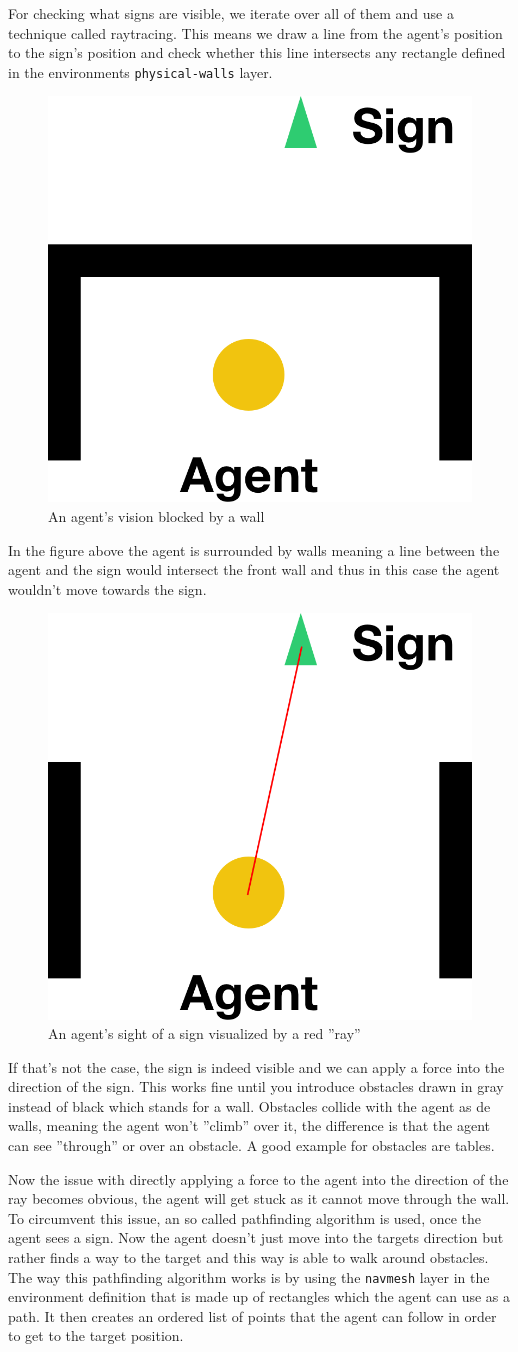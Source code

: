 \documentclass[11pt]{article}
\begin{document}
\begin{itemize}
    For checking what signs are visible, we iterate over all of them and use a technique called raytracing. This means we draw a line from the agent's position to the sign's position and check whether this line intersects any rectangle defined in the environments \texttt{physical-walls} layer. 
    
    \begin{figure}[H]
		\centering
		\includegraphics[width=0.25\linewidth]{assets/raytrace-blocked}\\
		An agent's vision blocked by a wall
	\end{figure}
	
	In the figure above the agent is surrounded by walls meaning a line between the agent and the sign would intersect the front wall and thus in this case the agent wouldn't move towards the sign.
	
	\begin{figure}[H]
		\centering
		\includegraphics[width=0.25\linewidth]{assets/raytrace-visible}\\
		An agent's sight of a sign visualized by a red ''ray''
	\end{figure}
    
    If that's not the case, the sign is indeed visible and we can apply a force into the direction of the sign. This works fine until you introduce obstacles drawn in gray instead of black which stands for a wall. Obstacles collide with the agent as de walls, meaning the agent won't ''climb'' over it, the difference is that the agent can see ''through'' or over an obstacle. A good example for obstacles are tables.
	
	Now the issue with directly applying a force to the agent into the direction of the ray becomes obvious, the agent will get stuck as it cannot move through the wall. To circumvent this issue, an so called pathfinding algorithm is used, once the agent sees a sign. Now the agent doesn't just move into the targets direction but rather finds a way to the target and this way is able to walk around obstacles. The way this pathfinding algorithm works is by using the \texttt{navmesh} layer in the environment definition that is made up of rectangles which the agent can use as a path. It then creates an ordered list of points that the agent can follow in order to get to the target position.
	

\end{itemize}
\end{document}
